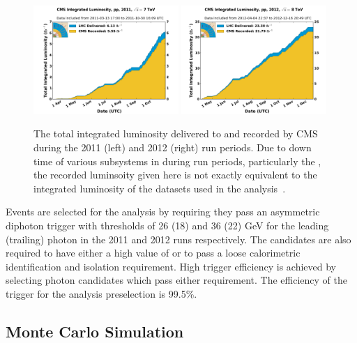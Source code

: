 \begin{figure}
  \includegraphics[width=0.49\textwidth]{analysis_comps/plots/int_lumi_2011.pdf}
  \includegraphics[width=0.49\textwidth]{analysis_comps/plots/int_lumi_2012.pdf}
  \caption[The total integrated luminosity delivered to and recorded by \acs{CMS} during the 2011 and 2012 run periods]{The total integrated luminosity delivered to and recorded by CMS during the 2011 (left) and 2012 (right) run periods. Due to down time of various subsystems in \CMS during run periods, particularly the \ECAL, the recorded luminsoity given here is not exactly equivalent to the integrated luminosity of the datasets used in the analysis~\cite{lumi1,lumi2}.}
  \label{fig:intlumi}
\end{figure}

Events are selected for the analysis by requiring they pass an asymmetric diphoton trigger with \ET thresholds of 26 (18) and 36 (22) GeV for the leading (trailing) photon in the 2011 and 2012 runs respectively. The candidates are also required to have either a high value of \rnine or to pass a loose calorimetric identification and isolation requirement. High trigger efficiency is achieved by selecting photon candidates which pass either requirement. The efficiency of the trigger for the analysis preselection is 99.5\%.

\subsection{Monte Carlo Simulation}
\label{sec:mc}

